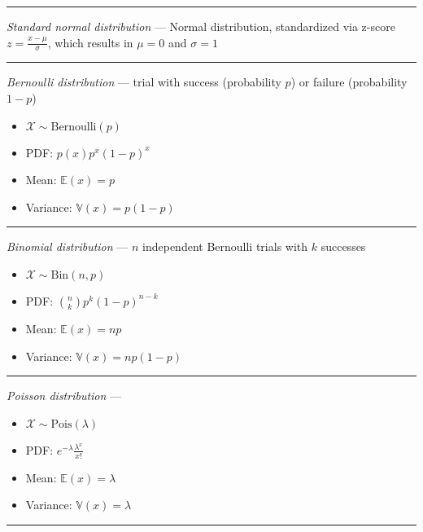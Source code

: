 {\color{lightgray}\hrule height 0.001mm}

\emph{Standard normal distribution} --- Normal distribution, standardized via z-score $z = \frac{x-\mu}{\sigma}$, which results in $\mu = 0$ and $\sigma = 1$

{\color{lightgray}\hrule height 0.001mm}

\emph{Bernoulli distribution} --- trial with success (probability $p$) or failure (probability $1-p$)
\begin{multicols}{2}
\begin{itemize}
    \item $\mathcal{X} \sim \textrm{Bernoulli}(p)$
    \item PDF: $p(x) p^x (1-p)^x$
    \item Mean: $\mathbb{E}(x) = p$
    \item Variance: $\mathbb{V}(x) = p(1-p)$
\end{itemize}
\end{multicols}

{\color{lightgray}\hrule height 0.001mm}

\emph{Binomial distribution} --- $n$ independent Bernoulli trials with $k$ successes
\begin{multicols}{2}
\begin{itemize}
    \item $\mathcal{X} \sim \textrm{Bin}(n,p)$
    \item PDF: $\binom{n}{k} p^k (1-p)^{n-k}$
    \item Mean: $\mathbb{E}(x) = np$
    \item Variance: $\mathbb{V}(x) = np(1-p)$
\end{itemize}
\end{multicols}

{\color{lightgray}\hrule height 0.001mm}

\emph{Poisson distribution} ---
\begin{multicols}{2}
\begin{itemize}
    \item $\mathcal{X} \sim \textrm{Pois}(\lambda)$
    \item PDF: $e^{-\lambda} \frac{\lambda^x}{x!}$
    \item Mean: $\mathbb{E}(x) = \lambda$
    \item Variance: $\mathbb{V}(x) = \lambda$
\end{itemize}
\end{multicols}

{\color{lightgray}\hrule height 0.001mm}

